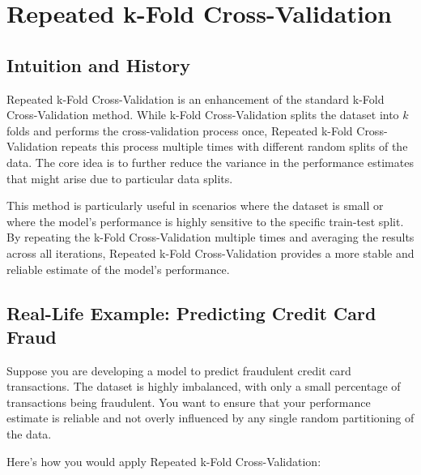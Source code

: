 \documentclass[10pt]{article}
\begin{document}
\section{Repeated k-Fold Cross-Validation}
\subsection{Intuition and History}
Repeated k-Fold Cross-Validation is an enhancement of the standard k-Fold Cross-Validation method. While k-Fold Cross-Validation splits the dataset into \(k\) folds and performs the cross-validation process once, Repeated k-Fold Cross-Validation repeats this process multiple times with different random splits of the data. The core idea is to further reduce the variance in the performance estimates that might arise due to particular data splits.

This method is particularly useful in scenarios where the dataset is small or where the model's performance is highly sensitive to the specific train-test split. By repeating the k-Fold Cross-Validation multiple times and averaging the results across all iterations, Repeated k-Fold Cross-Validation provides a more stable and reliable estimate of the model’s performance.

\subsection{Real-Life Example: Predicting Credit Card Fraud}
Suppose you are developing a model to predict fraudulent credit card transactions. The dataset is highly imbalanced, with only a small percentage of transactions being fraudulent. You want to ensure that your performance estimate is reliable and not overly influenced by any single random partitioning of the data.

Here’s how you would apply Repeated k-Fold Cross-Validation:
\end{document}
